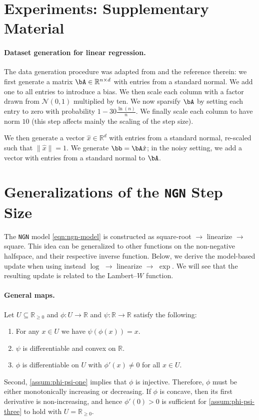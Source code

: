 \documentclass{article}
\let\temp\phi
\let\phi\varphi
\let\varphi\temp
\let\temp\varepsilon
\let\varepsilon\temp
\newcommand{\R}{\mathbb{R}}
\newcommand{\NGN}{{\texttt{NGN}}}
\theoremstyle{plain}
\theoremstyle{definition}
\theoremstyle{remark}
\begin{document}
\section{Experiments: Supplementary Material}\label{sec:app:experiments-supplementary}

\paragraph{Dataset generation for linear regression.}
The data generation procedure was adapted from \citet{Loizou2021} and the reference therein: we first generate a matrix $\bA \in\R^{n\times d}$ with entries from a standard normal. We add one to all entries to introduce a bias. We then scale each column with a factor drawn from $\mathcal{N}(0,1)$ multiplied by ten. We now sparsify $\bA$ by setting each entry to zero with probability $1-30\tfrac{\ln(n)}{n}$. We finally scale each column to have norm $10$ (this step affects mainly the scaling of the step size).

We then generate a vector $\hat{x} \in\R^d$ with entries from a standard normal, re-scaled such that $\|\hat{x}\|=1$. We generate $\bb = \bA \hat{x}$; in the noisy setting, we add a vector with entries from a standard normal to $\bA$. 


\section{Generalizations of the \NGN{} Step Size}\label{sec:app:ngn-generalizations}

The \NGN{} model \eqref{eqn:ngn-model} is constructed as square-root $\to$ linearize $\to$ square. This idea can be generalized to other functions on the non-negative halfspace, and their respective inverse function. Below, we derive the model-based update when using instead $\log$ $\to$ linearize $\to$ $\exp$. We will see that the resulting update is related to the Lambert--$W$ function.

\paragraph{General maps.} Let $U\subseteq  \R_{\geq 0}$ and $\varphi: U \to \R$ and $\psi: \R \to \R$ satisfy the following:
\begin{enumerate}[label=(B\arabic*)]
    \item \label{assum:phi-psi-one} For any $x \in U$ we have $\psi(\varphi(x)) = x$.
    \item \label{assum:phi-psi-two} $\psi$ is differentiable and convex on $\R$.
    \item \label{assum:phi-psi-three} $\varphi$ is differentiable on $U$ with $\varphi'(x) \neq 0$ for all $x\in U$.
\end{enumerate}
Second, \ref{assum:phi-psi-one} implies that $\varphi$ is injective. Therefore, $\varphi$ must be either monotonically increasing or decreasing. If $\varphi$ is concave, then its first derivative is non-increasing, and hence $\varphi'(0) >0$ is sufficient for \ref{assum:phi-psi-three} to hold with $U=\R_{\geq 0}$. 
\end{document}
